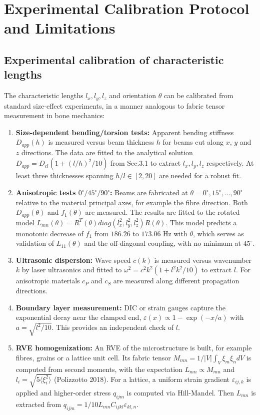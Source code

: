 \documentclass[final,3p,times,fleqn]{elsarticle}
\newcommand{\rev}[1]{\textcolor{revcolor}{#1}}
\begin{document}
\section{Experimental Calibration Protocol and Limitations}
\label{sec:calibration}

\subsection{Experimental calibration of characteristic lengths}
\label{sec:exp_calib}
\rev{The characteristic lengths $l_x,l_y,l_z$ and orientation $\theta$ can be calibrated from standard size-effect experiments, in a manner analogous to fabric tensor measurement in bone mechanics:}

\begin{enumerate}
    \item \rev{\textbf{Size-dependent bending/torsion tests:} Apparent bending stiffness $D_{app}(h)$ is measured versus beam thickness $h$ for beams cut along $x$, $y$ and $z$ directions. The data are fitted to the analytical solution $D_{app}=D_{cl}(1+ (l/h)^2/10)$ from Sec.3.1 to extract $l_x,l_y,l_z$ respectively. At least three thicknesses spanning $h/l\in[2,20]$ are needed for a robust fit.}
    \item \rev{\textbf{Anisotropic tests $0^\circ/45^\circ/90^\circ$:} Beams are fabricated at $\theta=0^\circ,15^\circ,...,90^\circ$ relative to the material principal axes, for example the fibre direction. Both $D_{app}(\theta)$ and $f_1(\theta)$ are measured. The results are fitted to the rotated model $L_{mn}(\theta)=R^T(\theta)diag(l_x^2,l_y^2,l_z^2)R(\theta)$. This model predicts a monotonic decrease of $f_1$ from $186.26$ to $173.06$ Hz with $\theta$, which serves as validation of $L_{11}(\theta)$ and the off-diagonal coupling, with no minimum at $45^\circ$.}
    \item \rev{\textbf{Ultrasonic dispersion:} Wave speed $c(k)$ is measured versus wavenumber $k$ by laser ultrasonics and fitted to $\omega^2=c^2k^2(1+l^2k^2/10)$ to extract $l$. For anisotropic materials $c_P$ and $c_S$ are measured along different propagation directions.}
    \item \rev{\textbf{Boundary layer measurement:} DIC or strain gauges capture the exponential decay near the clamped end, $\varepsilon(x)\propto 1-\exp(-x/a)$ with $a=\sqrt{l^2/10}$. This provides an independent check of $l$.}
    \item \rev{\textbf{RVE homogenization:} An RVE of the microstructure is built, for example fibres, grains or a lattice unit cell. Its fabric tensor $M_{mn}=1/|V|\int_V \xi_m\xi_n dV$ is computed from second moments, with the expectation $L_{mn}\propto M_{mn}$ and $l_i=\sqrt{5\langle\xi_i^2\rangle}$ (Polizzotto 2018). For a lattice, a uniform strain gradient $\varepsilon_{ij,k}$ is applied and higher-order stress $q_{ijm}$ is computed via Hill-Mandel. Then $L_{mn}$ is extracted from $q_{ijm}=1/10 L_{mn} C_{ijkl}\varepsilon_{kl,n}$.}

\end{enumerate}
\end{document}
